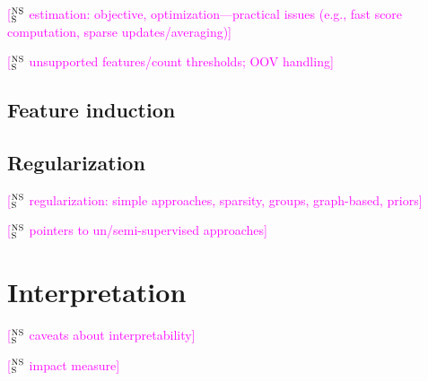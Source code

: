 \documentclass[11pt,letterpaper]{article}
\newcommand{\ensuretext}[1]{#1}
\newcommand{\nssmarker}{\ensuretext{\textcolor{magenta}{\ensuremath{^{\textsc{NS}}_{\textsc{S}}}}}}
\newcommand{\arkcomment}[3]{\ensuretext{\textcolor{#3}{[#1 #2]}}}
\newcommand{\nss}[1]{\arkcomment{\nssmarker}{#1}{magenta}}
\begin{document}
\nss{estimation: objective, optimization---practical issues (e.g., fast score computation, sparse updates/averaging)}

\nss{unsupported features/count thresholds; OOV handling}

\subsection{Feature induction}\label{sec:induction}

\subsection{Regularization}\label{sec:reg}

\nss{regularization: simple approaches, sparsity, groups, graph-based, priors}

\nss{pointers to un/semi-supervised approaches}

\section{Interpretation}\label{sec:interp}

\nss{caveats about interpretability}

\nss{impact measure}



\end{document}
